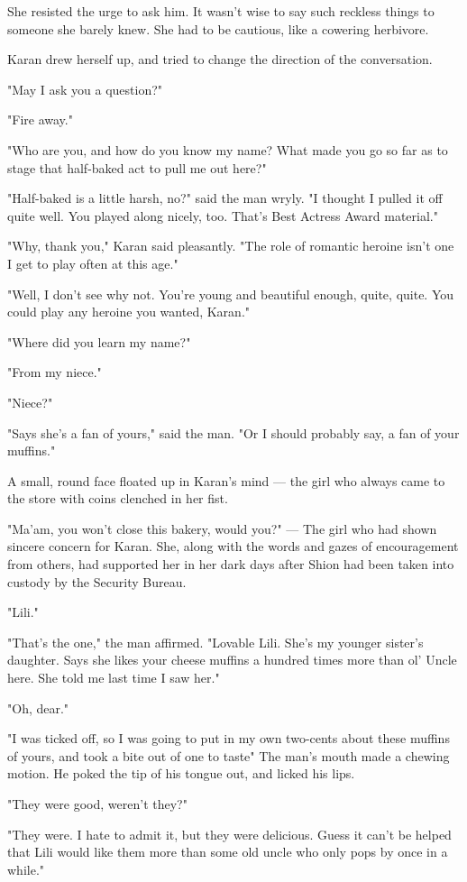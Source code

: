 She resisted the urge to ask him. It wasn't wise to say such reckless
things to someone she barely knew. She had to be cautious, like a
cowering herbivore.

Karan drew herself up, and tried to change the direction of the
conversation.

"May I ask you a question?"

"Fire away."

"Who are you, and how do you know my name? What made you go so far as to
stage that half-baked act to pull me out here?"

"Half-baked is a little harsh, no?" said the man wryly. "I thought I
pulled it off quite well. You played along nicely, too. That's Best
Actress Award material."

"Why, thank you," Karan said pleasantly. "The role of romantic heroine
isn't one I get to play often at this age."

"Well, I don't see why not. You're young and beautiful enough, quite,
quite. You could play any heroine you wanted, Karan."

"Where did you learn my name?"

"From my niece."

"Niece?"

"Says she's a fan of yours," said the man. "Or I should probably say, a
fan of your muffins."

A small, round face floated up in Karan's mind --- the girl who always
came to the store with coins clenched in her fist.

"Ma'am, you won't close this bakery, would you?" --- The girl who had
shown sincere concern for Karan. She, along with the words and gazes of
encouragement from others, had supported her in her dark days after
Shion had been taken into custody by the Security Bureau.

"Lili."

"That's the one," the man affirmed. "Lovable Lili. She's my younger
sister's daughter. Says she likes your cheese muffins a hundred times
more than ol' Uncle here. She told me last time I saw her."

"Oh, dear."

"I was ticked off, so I was going to put in my own two-cents about these
muffins of yours, and took a bite out of one to taste\el " The man's
mouth made a chewing motion. He poked the tip of his tongue out, and
licked his lips.

"They were good, weren't they?"

"They were. I hate to admit it, but they were delicious. Guess it can't
be helped that Lili would like them more than some old uncle who only
pops by once in a while."

